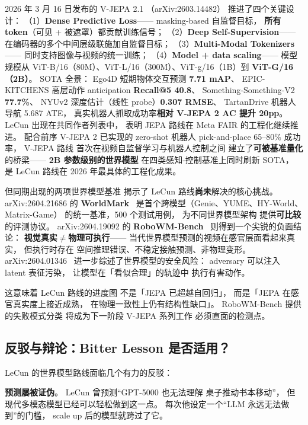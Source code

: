 2026 年 3 月 16 日发布的 V-JEPA 2.1
\cite{vjepa21_2603}（arXiv:2603.14482）
推进了四个关键设计：
（1）\textbf{Dense Predictive Loss}——
masking-based 自监督目标，
\textbf{所有 token}（可见 + 被遮罩）都贡献训练信号；
（2）\textbf{Deep Self-Supervision}——
在编码器的多个中间层级联施加自监督目标；
（3）\textbf{Multi-Modal Tokenizers}——
同时支持图像与视频的统一训练；
（4）\textbf{Model + data scaling}——
模型规模从 ViT-B/16（80M）、ViT-L/16（300M）、ViT-g/16（1B）到 \textbf{ViT-G/16（2B）}。
SOTA 全景：
Ego4D 短期物体交互预测 \textbf{7.71 mAP}、
EPIC-KITCHENS 高层动作 anticipation \textbf{Recall@5 40.8}、
Something-Something-V2 \textbf{77.7\%}、
NYUv2 深度估计（线性 probe）\textbf{0.307 RMSE}、
TartanDrive 机器人导航 5.687 ATE，
真实机器人抓取成功率\textbf{相对 V-JEPA 2 AC 提升 20pp}。
LeCun 出现在共同作者列表中，
表明 JEPA 路线在 Meta FAIR 的工程化继续推进。
配合前序 V-JEPA 2 已实现的
zero-shot 机器人 pick-and-place 65--80\% 成功率，
V-JEPA 路线
首次在视频自监督学习与机器人控制之间
建立了\textbf{可被基准量化}的桥梁——
\textbf{2B 参数级别的世界模型}
在四类感知-控制基准上同时刷新 SOTA，
是 LeCun 路线在 2026 年最具体的工程化成果。

但同期出现的两项世界模型基准
揭示了 LeCun 路线\textbf{尚未}解决的核心挑战。
arXiv:2604.21686 的 \textbf{WorldMark}~\cite{worldmark2604}
是首个跨模型（Genie、YUME、HY-World、Matrix-Game）
的统一基准，500 个测试用例，
为不同世界模型架构
提供\textbf{可比较}的评测协议。
arXiv:2604.19092 的 \textbf{RoboWM-Bench}~\cite{robowmbench2604}
则得到一个尖锐的负面结论：
\textbf{视觉真实}$\neq$\textbf{物理可执行}——
当代世界模型预测的视频在感官层面看起来真实，
但执行时存在
空间推理错误、不稳定接触预测、非物理变形。
arXiv:2604.01346~\cite{worldmodelsec2604}
进一步综述了世界模型的安全风险：
adversary 可以注入 latent 表征污染，
让模型在「看似合理」的轨迹中
执行有害动作。

这意味着 LeCun 路线的进度图
不是「JEPA 已超越自回归」，
而是「JEPA 在感官真实度上接近成熟，
在物理一致性上仍有结构性缺口」。
RoboWM-Bench 提供的失败模式分类
将成为下一阶段 V-JEPA 系列工作
必须直面的检测点。


\subsection{反驳与辩论：Bitter Lesson 是否适用？}

LeCun 的世界模型路线面临几个有力的反驳：

\textbf{预测屡被证伪}。
LeCun 曾预测``GPT-5000 也无法理解
桌子推动书本移动''，
但现代多模态模型已经可以轻松做到这一点。
每次他设定一个``LLM 永远无法做到''的门槛，
scale up 后的模型就跨过了它。

